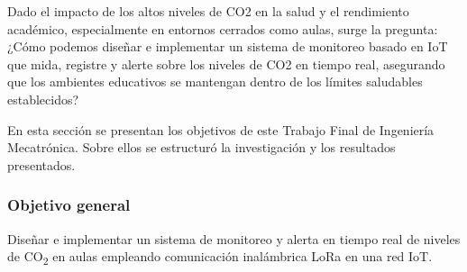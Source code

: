 
Dado el impacto de los altos niveles de CO2 en la salud y el rendimiento académico, especialmente en entornos cerrados como aulas, surge la pregunta: ¿Cómo podemos diseñar e implementar un sistema de monitoreo basado en IoT que mida, registre y alerte sobre los niveles de CO2 en tiempo real, asegurando que los ambientes educativos se mantengan dentro de los límites saludables establecidos?


En esta sección se presentan los objetivos de este Trabajo Final de Ingeniería Mecatrónica. Sobre ellos se estructuró la investigación y los resultados presentados.

\subsubsection*{Objetivo general}
Diseñar e implementar un sistema de monitoreo y alerta en tiempo real de niveles de CO\textsubscript{2} en aulas empleando comunicación inalámbrica LoRa en una red IoT.

